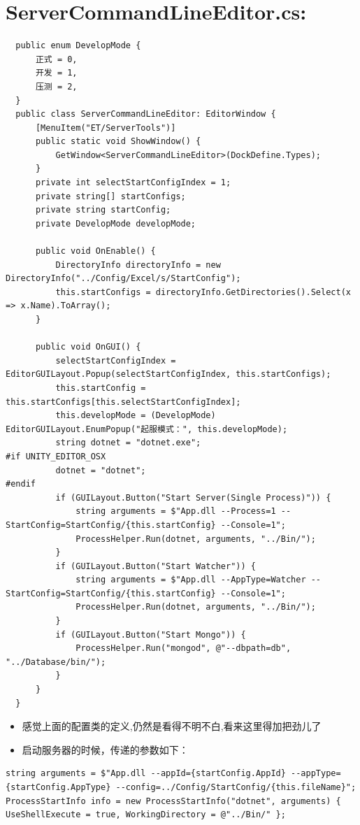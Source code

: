 \documentclass[9pt, b5paper]{article}
\begin{document}
\section{ServerCommandLineEditor.cs:}
\label{sec-15}
\begin{verbatim}
  public enum DevelopMode {
      正式 = 0,
      开发 = 1,
      压测 = 2,
  }
  public class ServerCommandLineEditor: EditorWindow {
      [MenuItem("ET/ServerTools")]
      public static void ShowWindow() {
          GetWindow<ServerCommandLineEditor>(DockDefine.Types);
      }
      private int selectStartConfigIndex = 1;
      private string[] startConfigs;
      private string startConfig;
      private DevelopMode developMode;

      public void OnEnable() {
          DirectoryInfo directoryInfo = new DirectoryInfo("../Config/Excel/s/StartConfig");
          this.startConfigs = directoryInfo.GetDirectories().Select(x => x.Name).ToArray();
      }

      public void OnGUI() {
          selectStartConfigIndex = EditorGUILayout.Popup(selectStartConfigIndex, this.startConfigs);
          this.startConfig = this.startConfigs[this.selectStartConfigIndex];
          this.developMode = (DevelopMode) EditorGUILayout.EnumPopup("起服模式：", this.developMode);
          string dotnet = "dotnet.exe";
#if UNITY_EDITOR_OSX
          dotnet = "dotnet";
#endif
          if (GUILayout.Button("Start Server(Single Process)")) {
              string arguments = $"App.dll --Process=1 --StartConfig=StartConfig/{this.startConfig} --Console=1";
              ProcessHelper.Run(dotnet, arguments, "../Bin/");
          }
          if (GUILayout.Button("Start Watcher")) {
              string arguments = $"App.dll --AppType=Watcher --StartConfig=StartConfig/{this.startConfig} --Console=1";
              ProcessHelper.Run(dotnet, arguments, "../Bin/");
          }
          if (GUILayout.Button("Start Mongo")) {
              ProcessHelper.Run("mongod", @"--dbpath=db", "../Database/bin/");
          }
      }
  }
\end{verbatim}
\begin{itemize}
\item 感觉上面的配置类的定义,仍然是看得不明不白,看来这里得加把劲儿了
\item 启动服务器的时候，传递的参数如下：
\end{itemize}
\begin{verbatim}
string arguments = $"App.dll --appId={startConfig.AppId} --appType={startConfig.AppType} --config=../Config/StartConfig/{this.fileName}";
ProcessStartInfo info = new ProcessStartInfo("dotnet", arguments) { UseShellExecute = true, WorkingDirectory = @"../Bin/" };
\end{verbatim}
\end{document}
